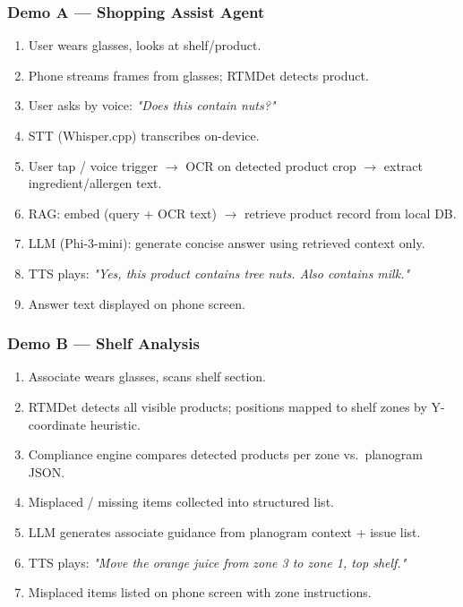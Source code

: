 \documentclass[11pt,a4paper]{article}
\begin{document}
\subsubsection{Demo A — Shopping Assist Agent}

\begin{enumerate}[noitemsep]
  \item User wears glasses, looks at shelf/product.
  \item Phone streams frames from glasses; RTMDet detects product.
  \item User asks by voice: \textit{"Does this contain nuts?"}
  \item STT (Whisper.cpp) transcribes on-device.
  \item User tap / voice trigger $\rightarrow$ OCR on detected product crop $\rightarrow$ extract ingredient/allergen text.
  \item RAG: embed (query + OCR text) $\rightarrow$ retrieve product record from local DB.
  \item LLM (Phi-3-mini): generate concise answer using retrieved context only.
  \item TTS plays: \textit{"Yes, this product contains tree nuts. Also contains milk."}
  \item Answer text displayed on phone screen.
\end{enumerate}

\subsubsection{Demo B — Shelf Analysis}

\begin{enumerate}[noitemsep]
  \item Associate wears glasses, scans shelf section.
  \item RTMDet detects all visible products; positions mapped to shelf zones by Y-coordinate heuristic.
  \item Compliance engine compares detected products per zone vs.\ planogram JSON.
  \item Misplaced / missing items collected into structured list.
  \item LLM generates associate guidance from planogram context + issue list.
  \item TTS plays: \textit{"Move the orange juice from zone 3 to zone 1, top shelf."}
  \item Misplaced items listed on phone screen with zone instructions.
\end{enumerate}
\end{document}
